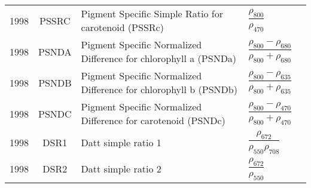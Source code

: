 \documentclass[10pt]{article}
\begin{document}
\begin{ThreePartTable}
\begin{longtable}{c c m{2.80in} M{2.80in} M{1.5in}}
  1998 & PSSRC   & Pigment Specific Simple Ratio for carotenoid (PSSRc)                           & $\dfrac{\rho_{800}}{\rho_{470}}$                                                                                                                                                                                                                                                        & \citet{Blackburn1998a,Blackburn1998b}               \\
  1998 & PSNDA   & Pigment Specific Normalized Difference for chlorophyll a (PSNDa)               & $\dfrac{\rho_{800}-\rho_{680}}{\rho_{800}+\rho_{680}}$                                                                                                                                                                                                                                  & \citet{Blackburn1998a,Blackburn1998b}               \\
  1998 & PSNDB   & Pigment Specific Normalized Difference for chlorophyll b (PSNDb)               & $\dfrac{\rho_{800}-\rho_{635}}{\rho_{800}+\rho_{635}}$                                                                                                                                                                                                                                  & \citet{Blackburn1998a,Blackburn1998b}               \\
  1998 & PSNDC   & Pigment Specific Normalized Difference for carotenoid (PSNDc)                  & $\dfrac{\rho_{800}-\rho_{470}}{\rho_{800}+\rho_{470}}$                                                                                                                                                                                                                                  & \citet{Blackburn1998a,Blackburn1998b}               \\
  1998 & DSR1    & Datt simple ratio 1                                                            & $\dfrac{\rho_{672}}{\rho_{550}\rho_{708}}$                                                                                                                                                                                                                                              & \citet{Datt1998}                                    \\
  1998 & DSR2    & Datt simple ratio 2                                                            & $\dfrac{\rho_{672}}{\rho_{550}}$                                                                                                                                                                                                                                                        & \citet{Datt1998}                                    \\

\end{longtable}
\end{ThreePartTable}
\end{document}
